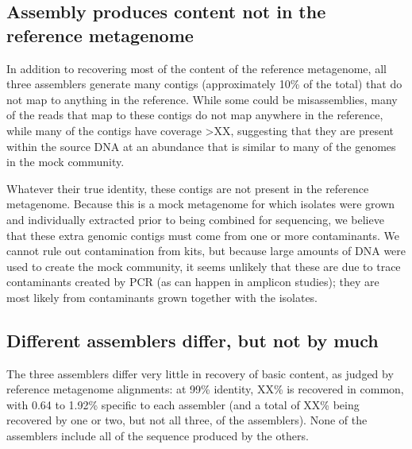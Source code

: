 \documentclass[10pt,a4paper,twocolumn]{article}
\begin{document}
\subsection*{Assembly produces content not in the reference metagenome}

In addition to recovering most of the content of the reference
metagenome, all three assemblers generate many contigs (approximately
10\% of the total) that do not map to anything in the reference.
While some could be misassemblies, many of the reads that map to these
contigs do not map anywhere in the reference, while many of the
contigs have coverage >XX, suggesting that they are present within the
source DNA at an abundance that is similar to many of the genomes in
the mock community.


Whatever their true identity, these contigs are not present in the
reference metagenome. Because this is a mock metagenome for which
isolates were grown and individually extracted prior to being combined
for sequencing, we believe that these extra genomic contigs must come
from one or more contaminants.  We cannot rule out contamination from
kits, but because large amounts of DNA were used to create the mock
community, it seems unlikely that these are due to trace contaminants
created by PCR (as can happen in amplicon studies); they are most
likely from contaminants grown together with the isolates.

\subsection*{Different assemblers differ, but not by much}

The three assemblers differ very little in recovery of basic content,
as judged by reference metagenome alignments: at 99\% identity, XX\%
is recovered in common, with 0.64 to 1.92\% specific to each assembler
(and a total of XX\% being recovered by one or two, but not all three,
of the assemblers). None of the assemblers include all of the sequence
produced by the others. %
\end{document}
